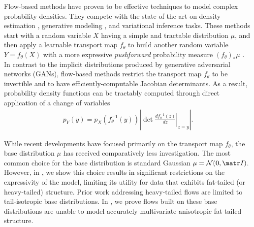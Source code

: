 \documentclass[thesis.tex]{subfiles}
\begin{document}
Flow-based methods 
\citep{papamakarios2021normalizing}
have proven to be effective techniques to model complex
probability densities. They compete with the state of the art on
density estimation \citep{huang2018neural,durkan2019neural,jaini2020tails},
generative modeling \citep{chen2019residual,kingma2018glow}, and variational inference \citep{kingma2016improved,agrawal2020advances} tasks.
These methods start with a random variable $X$ having a simple and tractable
distribution $\mu$, and then apply a learnable transport map $f_\theta$ to build
another random variable $Y = f_\theta(X)$ with a more expressive \emph{pushforward}
probability measure $(f_\theta)_\ast \mu$ \citep{papamakarios2021normalizing}.
In contrast to the implicit distributions \citep{huszar2017variational} produced by generative adversarial networks (GANs), flow-based methods restrict the transport map $f_\theta$ to be invertible and to have efficiently-computable Jacobian determinants.
As a result, probability density functions can be tractably computed
through direct application of a change of variables
\begin{align}
    \label{eq:change-of-variable}
    p_{Y}(y)
      = p_{X}(f_\theta^{-1}(y)) \left\lvert \det
        \left.\frac{d f_\theta^{-1}(z)}{dz} \right\vert_{z=y}
      \right\rvert .
\end{align}

While recent developments \citep{chen2019residual,huang2018neural,durkan2019neural} have focused primarily
on the transport map $f_\theta$, the base distribution $\mu$ has received comparatively less investigation. 
The most common choice for the base distribution is standard Gaussian $\mu = \cN(0,\mI)$.
However, in , we show this choice results in significant
restrictions on the expressivity of the model, limiting its utility for data that
exhibits fat-tailed (or heavy-tailed) structure.
Prior work addressing heavy-tailed flows \citep{jaini2020tails}
are limited to tail-isotropic base distributions.
In , we prove flows built on these base distributions
are unable to model accurately multivariate anisotropic fat-tailed structure.
\end{document}
